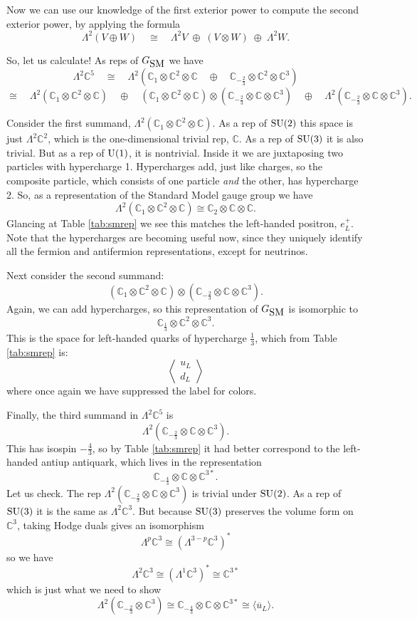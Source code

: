 \documentclass{article}
\newcommand{\C}{{\mathbb C}}  %
\newcommand{\U}{{\rm U}}    %
\newcommand{\SU}{{\rm SU}}    %
\newcommand{\Ex}{\Lambda} %
\newcommand{\iso}{\cong} %
\newcommand{\third}{\frac{1}{3}} %
\newcommand{\twothirds}{\frac{2}{3}} %
\newcommand{\fourthirds}{\frac{4}{3}} %
\newcommand{\GSM}{{G_{\mbox{\rm SM}}}}  %
\newcommand{\ubar}{\overline{u}} %
\newcommand{\angquark}{\left\langle \! \begin{array}{c} u_L \\ d_L \end{array} \! \right\rangle} %
\begin{document}
Now we can use our knowledge of the first exterior power to
compute the second exterior power, by applying the formula
\[ \Ex^2 (V \oplus W) \quad \iso \quad 
\Ex^2 V \; \oplus \; (V \otimes W) \; \oplus \; \Ex^2 W. \]

So, let us calculate!   As reps of $\GSM$ we have
\[  
\Ex^2 \C^5   \quad \iso \quad
\Ex^2 ( \C_1 \otimes \C^2 \otimes \C \quad 
\oplus \quad \C_{-\twothirds} \otimes \C^2 \otimes \C^3 )  
\]
\[
 \iso  \quad
\Ex^2 ( \C_1 \otimes \C^2 \otimes \C ) \quad \oplus 
     \quad (\C_1 \otimes \C^2 \otimes \C) \otimes 
(\C_{-\twothirds} \otimes \C \otimes \C^3) \quad \oplus 
    \quad \Ex^2 ( \C_{-\twothirds} \otimes \C \otimes \C^3 ).
\]

Consider the first summand, $\Ex^2 ( \C_1 \otimes
\C^2 \otimes \C)$.  As a rep of $\SU(2)$ this space is just $\Ex^2 \C^2$, 
which is the one-dimensional trivial rep, $\C$. 
As a rep of $\SU(3)$ it is also trivial.  But as a rep of
$\U(1)$, it is nontrivial.  Inside it we are juxtaposing 
two particles with hypercharge 1. Hypercharges add, just like charges, 
so the composite particle, which consists of one particle \textsl{and} 
the other, has hypercharge 2.  So, as a representation of the Standard
Model gauge group we have
\[ \Ex^2 (\C_1 \otimes \C^2 \otimes \C) \iso \C_2 \otimes \C \otimes \C  .\]
Glancing at Table \ref{tab:smrep} we see this matches the
left-handed positron, $e^+_L$.  Note that the hypercharges are becoming 
useful now, since they uniquely identify all the fermion and antifermion 
representations, except for neutrinos.

Next consider the second summand:
\[  (\C_1 \otimes \C^2 \otimes \C) \otimes
(\C_{-\twothirds} \otimes \C \otimes \C^3) . \]
Again, we can add hypercharges, so this representation of $\GSM$ is 
isomorphic to
\[ \C_\third \otimes \C^2 \otimes \C^3. \]
This is the space for left-handed quarks of hypercharge $\third$, which
from Table \ref{tab:smrep} is:
\[ \angquark \]
where once again we have suppressed the label for colors.

Finally, the third summand in $\Ex^2 \C^5$ is 
\[ \Ex^2 ( \C_{-\twothirds} \otimes \C \otimes \C^3 ) .\]
This has isospin $-\fourthirds$, so by Table \ref{tab:smrep}
it had better correspond to the left-handed antiup
antiquark, which lives in the representation
\[ \C_{-\fourthirds} \otimes \C \otimes \C^{3*}. \]
Let us check. 
The rep $\Ex^2 ( \C_{-\twothirds} \otimes \C \otimes \C^3 )$ 
is trivial under $\SU(2)$.  As a rep of $\SU(3)$ it is the same as $\Ex^2 \C^3$.  
But because $\SU(3)$ preserves the volume form on $\C^3$, taking Hodge duals 
gives an isomorphism 
\[ \Ex^p \C^3 \iso (\Ex^{3 - p} \C^3)^* \]
so we have
\[ \Ex^2 \C^3 \iso (\Ex^1 \C^3)^* \iso \C^{3*} \]
which is just what we need to show
\[ \Ex^2 ( \C_{-\twothirds} \otimes \C^3 ) \iso 
 \C_{-\fourthirds} \otimes \C \otimes \C^{3*} \iso 
\langle \ubar_L \rangle .\]
\end{document}
